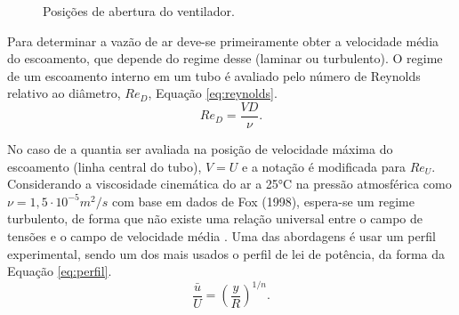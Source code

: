 \begin{figure}[!ht]
	\centering
	\caption{Posições de abertura do ventilador.}
	\label{fig:posicoes}
\end{figure}

Para determinar a vazão de ar deve-se primeiramente obter a velocidade média do escoamento, que depende do regime desse (laminar ou turbulento). O regime de um escoamento interno em um tubo é avaliado pelo número de Reynolds relativo ao diâmetro, $Re_{D}$, Equação \eqref{eq:reynolds}.
\begin{equation} \label{eq:reynolds}
Re_D = \frac{VD}{\nu}.
\end{equation}

No caso de a quantia ser avaliada na posição de velocidade máxima do escoamento (linha central do tubo), $V = U$ e a notação é modificada para $Re_{U}$. Considerando a viscosidade cinemática do ar a 25°C na pressão atmosférica como $\nu = 1,5\cdot 10^{-5} m^2/s$ com base em dados de Fox (1998), espera-se um regime turbulento, de forma que não existe uma relação universal entre o campo de tensões e o campo de velocidade média \cite{Fox}. Uma das abordagens é usar um perfil experimental, sendo um dos mais usados o perfil de lei de potência, da forma da Equação \eqref{eq:perfil}.
\begin{equation} \label{eq:perfil}
\frac{\bar{u}}{U} = {\left(\frac{y}{R}\right)}^{1/n}.
\end{equation}

